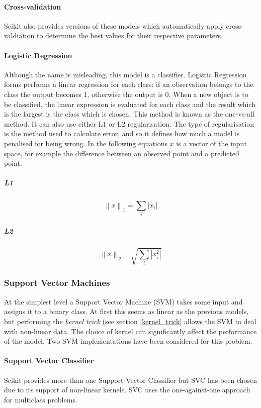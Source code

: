 \paragraph*{Cross-validation}
Scikit also provides versions of these models which automatically apply cross-valdiation to determine the best values for their respective parameters.

\paragraph*{Logistic Regression}
Although the name is misleading, this model is a classifier\cite{scikit_log}. Logistic Regression forms performs a linear regression for each class: if an observation belongs to the class the output becomes 1, otherwise the output is 0. When a new object is to be classified, the linear expression is evaluated for each class and the result which is the largest is the class which is chosen\cite{witten2011data}. This method is known as the one-vs-all method. It can also use either L1 or L2 regularisation. The type of regularisation is the method used to calculate error, and so it defines how much a model is penalised for being wrong. In the following equations $x$ is a vector of the input space, for example the difference between an observed point and a predicted point.
\subparagraph*{L1}
\begin{displaymath}
\left \|x  \right \|_{1} = \sum_{i}^{ } \left |x_{i}\right |
\end{displaymath}

\subparagraph*{L2}
\begin{displaymath}
\left \|x  \right \|_{2} = \sqrt{\sum_{i} \left |x^{2}_{i}\right |}
\end{displaymath}


\subsubsection{Support Vector Machines}
At the simplest level a Support Vector Machine (SVM) takes some input and assigns it to a binary class. At first this seems as linear as the previous models, but performing the {\it kernel trick} (see section \ref{kernel_trick} allows the SVM to deal with non-linear data. The choice of kernel can significantly affect the performance of the model. Two SVM implementations have been considered for this problem.

\paragraph*{Support Vector Classifier}
Scikit provides more than one Support Vector Classifier but SVC has been chosen due to its support of non-linear kernels. SVC uses the one-against-one approach for multiclass problems.

